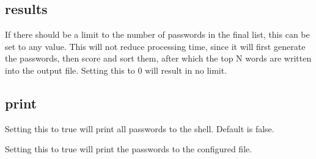 \documentclass[letterpaper,10pt,english]{sphinxmanual}
\begin{document}
\subsection{results}
\label{\detokenize{usage:results}}

\begin{fulllineitems}
\label{\detokenize{usage:max_words}}
\sphinxAtStartPar
If there should be a limit to the number of passwords in the final list, this can be set to any value. This will not reduce processing time, since it will first generate the passwords, then score and sort them, after which the top N words are written into the output file. Setting this to 0 will result in no limit.

\begin{sphinxVerbatim}[commandchars=\\\{\}]
   
\end{sphinxVerbatim}

\end{fulllineitems}



\subsection{print}
\label{\detokenize{usage:print}}

\begin{fulllineitems}
\label{\detokenize{usage:shell}}
\sphinxAtStartPar
Setting this to true will print all passwords to the shell. Default is false.

\begin{sphinxVerbatim}[commandchars=\\\{\}]
   
\end{sphinxVerbatim}

\end{fulllineitems}


\begin{fulllineitems}
\label{\detokenize{usage:file}}
\sphinxAtStartPar
Setting this to true will print the passwords to the configured file.

\begin{sphinxVerbatim}[commandchars=\\\{\}]
   
\end{sphinxVerbatim}

\end{fulllineitems}
\end{document}
